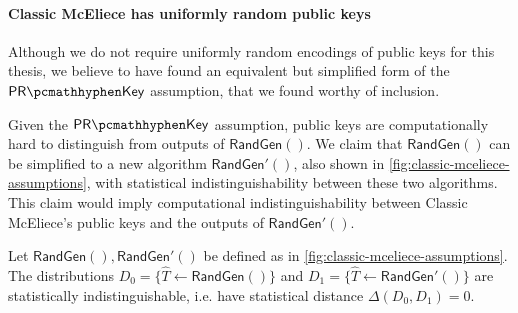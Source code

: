 \paragraph{Classic McEliece has uniformly random public keys}
Although we do not require uniformly random encodings of public keys for this thesis, we believe to have found an equivalent but simplified form of the $\prkey$ assumption, that we found worthy of inclusion.

Given the $\prkey$ assumption, public keys are computationally hard to distinguish from outputs of $\mathsf{RandGen}()$. We claim that $\mathsf{RandGen}()$ can be simplified to a new algorithm $\mathsf{RandGen}'()$, also shown in \cref{fig:classic-mceliece-assumptions}, with statistical indistinguishability between these two algorithms. This claim would imply computational indistinguishability between Classic McEliece's public keys and the outputs of $\mathsf{RandGen}'()$.

\begin{lemma} \label{lem:classic-mceliece-randgen-prime}
    Let $\mathsf{RandGen}(), \mathsf{RandGen}'()$ be defined as in \cref{fig:classic-mceliece-assumptions}.
    The distributions $D_0 = \{ \hat T \gets \mathsf{RandGen}() \}$ and $D_1 = \{ \hat T \gets \mathsf{RandGen}'() \}$ are statistically indistinguishable, i.e. have statistical distance $\Delta(D_0, D_1) = 0$.
\end{lemma}

